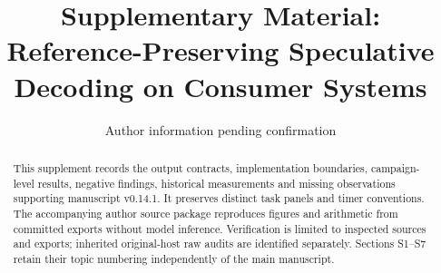 \documentclass[preprint,12pt,nopreprintline]{elsarticle}
\begin{document}
\begin{frontmatter}
\title{Supplementary Material: Reference-Preserving Speculative Decoding on Consumer Systems}
\author{Author information pending confirmation}
\begin{abstract}
This supplement records the output contracts, implementation boundaries, campaign-level results, negative findings, historical measurements and missing observations supporting manuscript v0.14.1. It preserves distinct task panels and timer conventions. The accompanying author source package reproduces figures and arithmetic from committed exports without model inference. Verification is limited to inspected sources and exports; inherited original-host raw audits are identified separately. Sections S1--S7 retain their topic numbering independently of the main manuscript.
\end{abstract}
\end{frontmatter}
\renewcommand{\thesection}{S\arabic{section}}
\renewcommand{\thetable}{S\arabic{table}}
\renewcommand{\theequation}{S\arabic{equation}}
\setcounter{tocdepth}{2}
\clearpage
\tableofcontents
\clearpage







\begingroup\small

\endgroup
\end{document}
